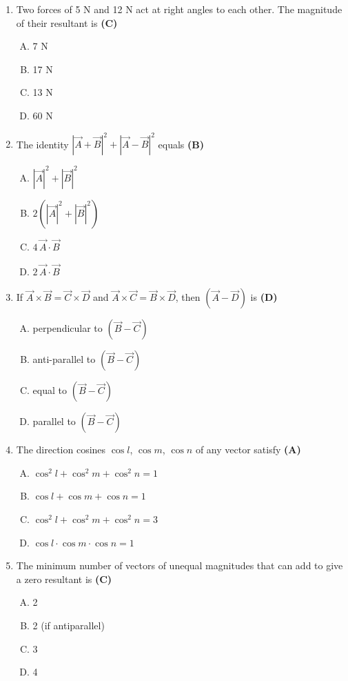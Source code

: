 \documentclass[10pt,a4paper]{article}
\begin{document}
\begin{enumerate}[1.]
\item Two forces of 5 N and 12 N act at right angles to each other. The magnitude of their resultant is \hfill \textbf{(C)}
\begin{enumerate}[(A)]
    \item 7 N
    \item 17 N
    \item 13 N
    \item 60 N
\end{enumerate}

\item The identity $|\vec{A}+\vec{B}|^2 + |\vec{A}-\vec{B}|^2$ equals \hfill \textbf{(B)}
\begin{enumerate}[(A)]
    \item $|\vec{A}|^2 + |\vec{B}|^2$
    \item $2(|\vec{A}|^2 + |\vec{B}|^2)$
    \item $4\,\vec{A}\cdot\vec{B}$
    \item $2\,\vec{A}\cdot\vec{B}$
\end{enumerate}

\item If $\vec{A}\times\vec{B} = \vec{C}\times\vec{D}$ and $\vec{A}\times\vec{C} = \vec{B}\times\vec{D}$, then $(\vec{A}-\vec{D})$ is \hfill \textbf{(D)}
\begin{enumerate}[(A)]
    \item perpendicular to $(\vec{B}-\vec{C})$
    \item anti-parallel to $(\vec{B}-\vec{C})$
    \item equal to $(\vec{B}-\vec{C})$
    \item parallel to $(\vec{B}-\vec{C})$
\end{enumerate}

\item The direction cosines $\cos l$, $\cos m$, $\cos n$ of any vector satisfy \hfill \textbf{(A)}
\begin{enumerate}[(A)]
    \item $\cos^2 l + \cos^2 m + \cos^2 n = 1$
    \item $\cos l + \cos m + \cos n = 1$
    \item $\cos^2 l + \cos^2 m + \cos^2 n = 3$
    \item $\cos l \cdot \cos m \cdot \cos n = 1$
\end{enumerate}

\item The minimum number of vectors of unequal magnitudes that can add to give a zero resultant is \hfill \textbf{(C)}
\begin{enumerate}[(A)]
    \item 2
    \item 2 (if antiparallel)
    \item 3
    \item 4
\end{enumerate}


\end{enumerate}
\end{document}

